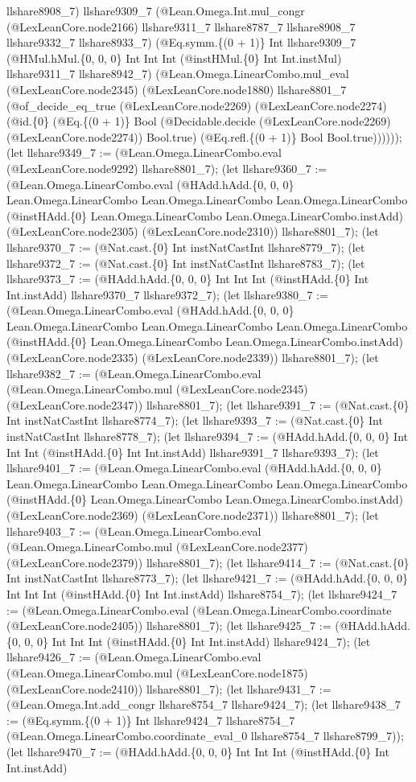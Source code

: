 \documentclass[11pt]{article}
\begin{document}
llshare8908\_7) llshare9309\_7 (@Lean.Omega.Int.mul\_congr (@LexLeanCore.node2166) llshare9311\_7 llshare8787\_7 llshare8908\_7 llshare9332\_7 llshare8933\_7) (@Eq.symm.\{(0 + 1)\} Int llshare9309\_7 (@HMul.hMul.\{0, 0, 0\} Int Int Int (@instHMul.\{0\} Int Int.instMul) llshare9311\_7 llshare8942\_7) (@Lean.Omega.LinearCombo.mul\_eval (@LexLeanCore.node2345) (@LexLeanCore.node1880) llshare8801\_7 (@of\_decide\_eq\_true (@LexLeanCore.node2269) (@LexLeanCore.node2274) (@id.\{0\} (@Eq.\{(0 + 1)\} Bool (@Decidable.decide (@LexLeanCore.node2269) (@LexLeanCore.node2274)) Bool.true) (@Eq.refl.\{(0 + 1)\} Bool Bool.true)))))); (let llshare9349\_7 := (@Lean.Omega.LinearCombo.eval (@LexLeanCore.node9292) llshare8801\_7); (let llshare9360\_7 := (@Lean.Omega.LinearCombo.eval (@HAdd.hAdd.\{0, 0, 0\} Lean.Omega.LinearCombo Lean.Omega.LinearCombo Lean.Omega.LinearCombo (@instHAdd.\{0\} Lean.Omega.LinearCombo Lean.Omega.LinearCombo.instAdd) (@LexLeanCore.node2305) (@LexLeanCore.node2310)) llshare8801\_7); (let llshare9370\_7 := (@Nat.cast.\{0\} Int instNatCastInt llshare8779\_7); (let llshare9372\_7 := (@Nat.cast.\{0\} Int instNatCastInt llshare8783\_7); (let llshare9373\_7 := (@HAdd.hAdd.\{0, 0, 0\} Int Int Int (@instHAdd.\{0\} Int Int.instAdd) llshare9370\_7 llshare9372\_7); (let llshare9380\_7 := (@Lean.Omega.LinearCombo.eval (@HAdd.hAdd.\{0, 0, 0\} Lean.Omega.LinearCombo Lean.Omega.LinearCombo Lean.Omega.LinearCombo (@instHAdd.\{0\} Lean.Omega.LinearCombo Lean.Omega.LinearCombo.instAdd) (@LexLeanCore.node2335) (@LexLeanCore.node2339)) llshare8801\_7); (let llshare9382\_7 := (@Lean.Omega.LinearCombo.eval (@Lean.Omega.LinearCombo.mul (@LexLeanCore.node2345) (@LexLeanCore.node2347)) llshare8801\_7); (let llshare9391\_7 := (@Nat.cast.\{0\} Int instNatCastInt llshare8774\_7); (let llshare9393\_7 := (@Nat.cast.\{0\} Int instNatCastInt llshare8778\_7); (let llshare9394\_7 := (@HAdd.hAdd.\{0, 0, 0\} Int Int Int (@instHAdd.\{0\} Int Int.instAdd) llshare9391\_7 llshare9393\_7); (let llshare9401\_7 := (@Lean.Omega.LinearCombo.eval (@HAdd.hAdd.\{0, 0, 0\} Lean.Omega.LinearCombo Lean.Omega.LinearCombo Lean.Omega.LinearCombo (@instHAdd.\{0\} Lean.Omega.LinearCombo Lean.Omega.LinearCombo.instAdd) (@LexLeanCore.node2369) (@LexLeanCore.node2371)) llshare8801\_7); (let llshare9403\_7 := (@Lean.Omega.LinearCombo.eval (@Lean.Omega.LinearCombo.mul (@LexLeanCore.node2377) (@LexLeanCore.node2379)) llshare8801\_7); (let llshare9414\_7 := (@Nat.cast.\{0\} Int instNatCastInt llshare8773\_7); (let llshare9421\_7 := (@HAdd.hAdd.\{0, 0, 0\} Int Int Int (@instHAdd.\{0\} Int Int.instAdd) llshare8754\_7); (let llshare9424\_7 := (@Lean.Omega.LinearCombo.eval (@Lean.Omega.LinearCombo.coordinate (@LexLeanCore.node2405)) llshare8801\_7); (let llshare9425\_7 := (@HAdd.hAdd.\{0, 0, 0\} Int Int Int (@instHAdd.\{0\} Int Int.instAdd) llshare9424\_7); (let llshare9426\_7 := (@Lean.Omega.LinearCombo.eval (@Lean.Omega.LinearCombo.mul (@LexLeanCore.node1875) (@LexLeanCore.node2410)) llshare8801\_7); (let llshare9431\_7 := (@Lean.Omega.Int.add\_congr llshare8754\_7 llshare9424\_7); (let llshare9438\_7 := (@Eq.symm.\{(0 + 1)\} Int llshare9424\_7 llshare8754\_7 (@Lean.Omega.LinearCombo.coordinate\_eval\_0 llshare8754\_7 llshare8799\_7)); (let llshare9470\_7 := (@HAdd.hAdd.\{0, 0, 0\} Int Int Int (@instHAdd.\{0\} Int Int.instAdd) 
\end{document}
